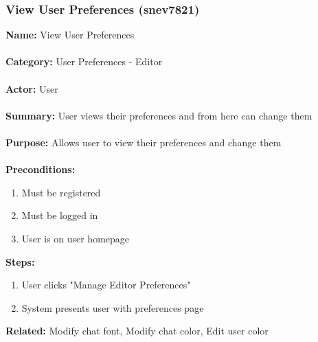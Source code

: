 \documentclass[11pt]{report}
\begin{document}
\subsubsection{View User Preferences (snev7821)}
\begin{framed}
	\noindent\textbf{Name:} View User Preferences \\ \\
	\textbf{Category:} User Preferences - Editor  \\ \\
	\textbf{Actor:} User \\ \\
	\textbf{Summary:} User views their preferences and from here can change them \\ \\
	\textbf{Purpose:} Allows user to view their preferences and change them \\ \\
	\textbf{Preconditions:} 
	\begin{enumerate}
		\item Must be registered
		\item Must be logged in
		\item User is on user homepage
	\end{enumerate}
	\textbf{Steps:}
	\begin{enumerate}
		\item User clicks "Manage Editor Preferences"
		\item System presents user with preferences page
	\end{enumerate}
	\textbf{Related:} Modify chat font, Modify chat color, Edit user color
\end{framed}

\newpage
\end{document}
